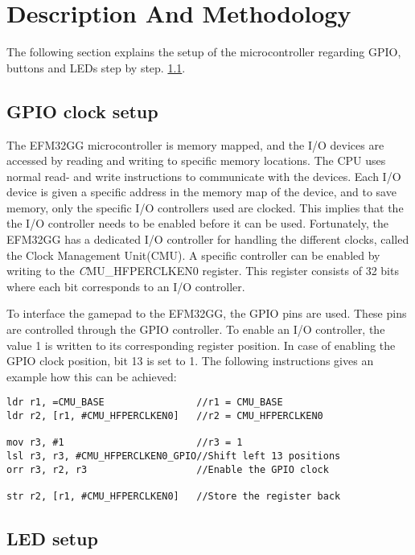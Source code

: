 \section{Description And Methodology}

The following section explains the setup of the microcontroller regarding GPIO, buttons and LEDs step by step. \ref{ch:initial_setup}. 


\subsection{GPIO clock setup} \label{ch:initial_setup}
The EFM32GG microcontroller is memory mapped, and the I/O devices are accessed by reading and writing to specific memory locations. The CPU uses normal read- and write instructions to communicate with the devices. Each I/O device is given a specific address in the memory map of the device, and to save memory, only the specific I/O controllers used are clocked. This implies that the the I/O controller needs to be enabled before it can be used. Fortunately, the EFM32GG has a dedicated I/O controller for handling the different clocks, called the Clock Management Unit(CMU). A specific controller can be enabled by writing to the \emph CMU\_HFPERCLKEN0 register. This register consists of 32 bits where each bit corresponds to an I/O controller. 

To interface the gamepad to the EFM32GG, the GPIO pins are used. These pins are controlled through the GPIO controller. To enable an I/O controller, the value 1 is written to its corresponding register position. In case of enabling the GPIO clock position, bit 13 is set to 1. The following instructions gives an example how this can be achieved: 

\begin{lstlisting}
ldr r1, =CMU_BASE                //r1 = CMU_BASE
ldr r2, [r1, #CMU_HFPERCLKEN0]   //r2 = CMU_HFPERCLKEN0 

mov r3, #1                       //r3 = 1
lsl r3, r3, #CMU_HFPERCLKEN0_GPIO//Shift left 13 positions
orr r3, r2, r3                   //Enable the GPIO clock

str r2, [r1, #CMU_HFPERCLKEN0]   //Store the register back 
\end{lstlisting}

\subsection{LED setup}\label{led-setup}

